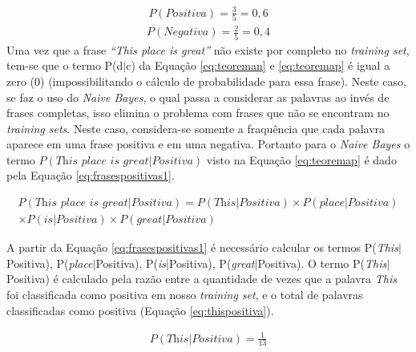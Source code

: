 \begin{equation}
\begin{gathered}
P(Positiva)
=
\frac{3}{5} = 0,6
\label{eq:frasespositivas}
\end{gathered}
\end{equation}
\begin{equation}
\begin{gathered}
P(Negativa)
=
\frac{2}{5} = 0,4
\label{eq:frasesnegativas}
\end{gathered}
\end{equation}
Uma vez que a frase \textit{``This place is great''} não existe por completo no
\textit{training set}, tem-se que o termo P(d$\vert$c) da Equação
\ref{eq:teoreman} e \ref{eq:teoremap} é igual a zero (0) (impossibilitando o
cálculo de probabilidade para essa frase). Neste caso, se faz o uso do
\textit{Naive Bayes}, o qual passa a considerar as palavras ao invés de frases
completas, isso elimina o problema com frases que não se
encontram no \textit{training sets}. Neste caso, considera-se somente a
fraquência que cada palavra aparece em uma frase positiva e em uma negativa.
Portanto para o \textit{Naive Bayes} o termo $P(\textit{This place is
great}|Positiva)$ visto na Equação \ref{eq:teoremap} é dado pela Equação
\ref{eq:frasespositivas1}.

\begin{equation}
\begin{gathered}
P(\textit{This place is great}|Positiva) = P(\textit{This}|Positiva)
\times P(\textit{place}|Positiva) \\ \times P(\textit{is}|Positiva) \times
P(\textit{great}|Positiva)
\label{eq:frasespositivas1}
\end{gathered}
\end{equation}

A partir da Equação \ref{eq:frasespositivas1} é necessário calcular os
termos P(\textit{This}$\vert$Positiva),
P(\textit{place}$\vert$Positiva), P(\textit{is}$\vert$Positiva), P(\textit{great}$\vert$Positiva).
O termo P(\textit{This}$\vert$Positiva) é calculado pela razão entre a
quantidade de vezes que a palavra \textit{This} foi classificada como positiva em nosso
\textit{training set}, e o total de palavras classificadas como positiva
(Equação \ref{eq:thispositiva}).

\begin{equation}
\begin{gathered}
P(\textit{This}|Positiva) = \frac{1}{13}
\label{eq:thispositiva}
\end{gathered}
\end{equation}


